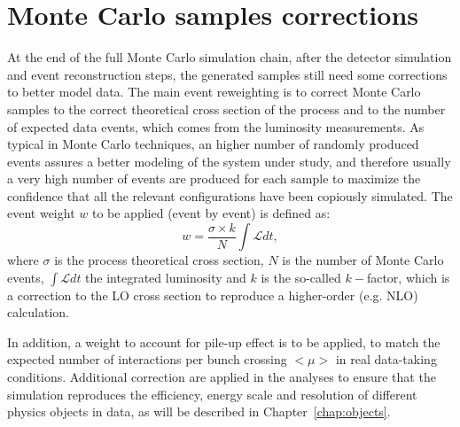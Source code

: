 \section{Monte Carlo samples corrections}\label{sec:mcweights}

At the end of the full Monte Carlo simulation chain, after the detector simulation
and event reconstruction steps, the generated samples still need some corrections to
better model data. The main event reweighting is to correct Monte Carlo samples to
the correct theoretical cross section of the process and to the number of expected
data events, which comes from the luminosity measurements. As typical in Monte
Carlo techniques, an higher number of randomly produced events assures a better modeling
of the system under study, and therefore usually a very high number of events are
produced for each sample to maximize the confidence that all the relevant configurations
have been copiously simulated. The event weight $w$ to be applied (event by event) is defined
as:
\begin{equation}\label{eq:mcweight}
w = \dfrac{\sigma\times k}{N}\int \mathcal L dt,
\end{equation}
where $\sigma$ is the process theoretical cross section, $N$ is the number of Monte
Carlo events, $\int \mathcal L dt$ the integrated luminosity and $k$ is the so-called
$k-$factor, which is a correction to 
the LO cross section to reproduce a higher-order
(e.g. NLO) calculation.

In addition, a weight to account for pile-up effect is to 
be applied, to match the
expected number of interactions per bunch crossing $<\mu>$
 in real data-taking conditions. 
Additional correction are applied in the analyses
to ensure that the simulation reproduces the efficiency,
energy scale and resolution of different
physics objects in data, as will be described in
Chapter~\ref{chap:objects}.
